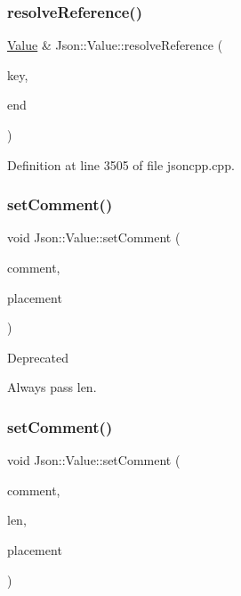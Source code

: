 \subsubsection{\texorpdfstring{resolve\+Reference()}{resolveReference()}\hspace{0.1cm}{\footnotesize\ttfamily [4/4]}}
{\footnotesize\ttfamily \hyperlink{class_json_1_1_value}{Value} \& Json\+::\+Value\+::resolve\+Reference (\begin{DoxyParamCaption}\item[{const char $\ast$}]{key,  }\item[{const char $\ast$}]{end }\end{DoxyParamCaption})\hspace{0.3cm}{\ttfamily [private]}}



Definition at line 3505 of file jsoncpp.\+cpp.

\hypertarget{class_json_1_1_value_a29f3a30f7e5d3af6f38d57999bf5b480}{}\label{class_json_1_1_value_a29f3a30f7e5d3af6f38d57999bf5b480} 
\subsubsection{\texorpdfstring{set\+Comment()}{setComment()}\hspace{0.1cm}{\footnotesize\ttfamily [1/6]}}
{\footnotesize\ttfamily void Json\+::\+Value\+::set\+Comment (\begin{DoxyParamCaption}\item[{const char $\ast$}]{comment,  }\item[{\hyperlink{namespace_json_a4fc417c23905b2ae9e2c47d197a45351}{Comment\+Placement}}]{placement }\end{DoxyParamCaption})}

\begin{DoxyRefDesc}{Deprecated}
\item[\hyperlink{deprecated__deprecated000015}{Deprecated}]Always pass len. \end{DoxyRefDesc}
\hypertarget{class_json_1_1_value_a2900152a2887b410a9ddabe278b9d492}{}\label{class_json_1_1_value_a2900152a2887b410a9ddabe278b9d492} 
\subsubsection{\texorpdfstring{set\+Comment()}{setComment()}\hspace{0.1cm}{\footnotesize\ttfamily [2/6]}}
{\footnotesize\ttfamily void Json\+::\+Value\+::set\+Comment (\begin{DoxyParamCaption}\item[{const char $\ast$}]{comment,  }\item[{size\+\_\+t}]{len,  }\item[{\hyperlink{namespace_json_a4fc417c23905b2ae9e2c47d197a45351}{Comment\+Placement}}]{placement }\end{DoxyParamCaption})}



